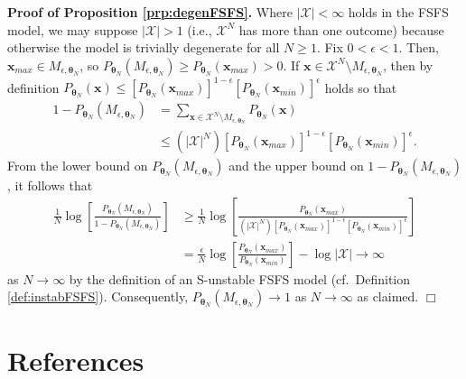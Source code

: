 \documentclass[]{article}
\theoremstyle{definition}
\begin{document}
\textbf{Proof of Proposition \ref{prp:degenFSFS}.} Where
\(|\mathcal{X}|<\infty\) holds in the FSFS model, we may suppose
\(|\mathcal{X}|>1\) (i.e., \(\mathcal{X}^N\) has more than one outcome)
because otherwise the model is trivially degenerate for all
\(N \geq 1\). Fix \(0 < \epsilon < 1\). Then,
\(\boldsymbol x_{max} \in M_{\epsilon, \boldsymbol \theta_N}\), so
\(P_{\boldsymbol \theta_N}(M_{\epsilon, \boldsymbol \theta_N}) \ge P_{\boldsymbol \theta_N}(\boldsymbol x_{max}) > 0\).
If
\(\boldsymbol x \in \mathcal{X}^N \setminus M_{\epsilon, \boldsymbol \theta_N}\),
then by definition
\(P_{\boldsymbol \theta_N}(\boldsymbol x) \le [P_{\boldsymbol \theta_N}(\boldsymbol x_{max})]^{1-\epsilon}[P_{\boldsymbol \theta_N}(\boldsymbol x_{min})]^{\epsilon}\)
holds so that
\begin{align*}
1-P_{\boldsymbol \theta_N}(M_{\epsilon, \boldsymbol \theta_N})
& = \sum\limits_{\boldsymbol x \in \mathcal{X}^N \setminus M_{\epsilon, \boldsymbol \theta_N}}P_{\boldsymbol \theta_N}(\boldsymbol x) \\
& \le (|\mathcal{X}|^N)[P_{\boldsymbol \theta_N}(\boldsymbol x_{max})]^{1-\epsilon}[P_{\boldsymbol \theta_N}(\boldsymbol x_{min})]^{\epsilon}.
\end{align*}
From the lower bound on
\(P_{\boldsymbol \theta_N}(M_{\epsilon, \boldsymbol \theta_N})\) and the
upper bound on
\(1-P_{\boldsymbol \theta_N}(M_{\epsilon, \boldsymbol \theta_N})\), it
follows that
\begin{align*}
\frac{1}{N}\log\left[\frac{P_{\boldsymbol \theta_N}(M_{\epsilon, \boldsymbol \theta_N})}{1-P_{\boldsymbol \theta_N}(M_{\epsilon, \boldsymbol \theta_N})}\right] & \ge \frac{1}{N} \log\left[\frac{P_{\boldsymbol\theta_N}(\boldsymbol x_{max})}{(|\mathcal{X}|^N)[P_{\boldsymbol \theta_N}(\boldsymbol x_{max})]^{1-\epsilon}[P_{\boldsymbol \theta_N}(\boldsymbol x_{min})]^{\epsilon}}\right] \\
&= \frac{\epsilon}{N} \log\left[\frac{P_{\boldsymbol \theta_N}(\boldsymbol x_{max})}{P_{\boldsymbol \theta_N}(\boldsymbol x_{min})}\right] - \log |\mathcal{X}| \rightarrow \infty
\end{align*}
as \(N \rightarrow \infty\) by the definition of an S-unstable FSFS
model (cf.~Definition \ref{def:instabFSFS}). Consequently,
\(P_{\boldsymbol \theta_N}(M_{\epsilon, \boldsymbol \theta_N}) \rightarrow 1\)
as \(N \rightarrow \infty\) as claimed. \hfill \(\Box\)

\clearpage

\section*{References}\label{references}
\end{document}
